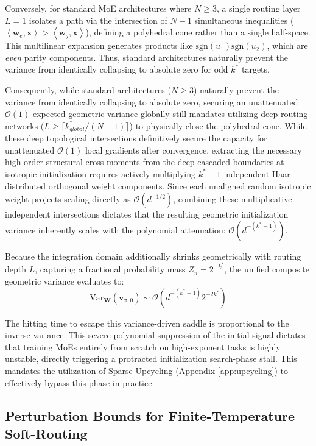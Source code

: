 \documentclass{article}
\newcommand{\1}{\mathbb{I}}
\newcommand{\inner}[2]{\left\langle#1, #2\right\rangle}
\newcommand{\calO}{\mathcal{O}}
\newcommand{\bx}{\mathbf{x}}
\newcommand{\bw}{\mathbf{w}}
\newcommand{\bv}{\mathbf{v}}
\newcommand{\bW}{\mathbf{W}}
\newcommand{\sgn}{\mathrm{sgn}}
\newcommand{\Var}{\mathrm{Var}}
\begin{document}
Conversely, for standard MoE architectures where $N \ge 3$, a single routing layer $L=1$ isolates a path via the intersection of $N-1$ simultaneous inequalities ($\inner{\bw_e}{\bx} > \inner{\bw_j}{\bx}$), defining a polyhedral cone rather than a single half-space. This multilinear expansion generates products like $\sgn(u_1)\sgn(u_2)$, which are \textit{even} parity components. Thus, standard architectures naturally prevent the variance from identically collapsing to absolute zero for odd $k^*$ targets.

Consequently, while standard architectures ($N \ge 3$) naturally prevent the variance from identically collapsing to absolute zero, securing an unattenuated $\calO(1)$ expected geometric variance globally still mandates utilizing deep routing networks ($L \ge \lceil k_{global}^*/(N-1) \rceil$) to physically close the polyhedral cone. While these deep topological intersections definitively secure the capacity for unattenuated $\calO(1)$ local gradients after convergence, extracting the necessary high-order structural cross-moments from the deep cascaded boundaries at isotropic initialization requires actively multiplying $k^*-1$ independent Haar-distributed orthogonal weight components. Since each unaligned random isotropic weight projects scaling directly as $\calO(d^{-1/2})$, combining these multiplicative independent intersections dictates that the resulting geometric initialization variance inherently scales with the polynomial attenuation: $\calO(d^{-(k^*-1)})$. 

Because the integration domain additionally shrinks geometrically with routing depth $L$, capturing a fractional probability mass $Z_\pi = 2^{-k^*}$, the unified composite geometric variance evaluates to:
\begin{equation}
    \Var_\bW(\bv_{\pi, 0}) \sim \calO\left( d^{-(k^*-1)} 2^{-2k^*} \right)
\end{equation}

The hitting time to escape this variance-driven saddle is proportional to the inverse variance. This severe polynomial suppression of the initial signal dictates that training MoEs entirely from scratch on high-exponent tasks is highly unstable, directly triggering a protracted initialization search-phase stall. This mandates the utilization of Sparse Upcycling (Appendix \ref{app:upcycling}) to effectively bypass this phase in practice.

\subsection{Perturbation Bounds for Finite-Temperature Soft-Routing}
\label{app:defense_soft}
\end{document}
